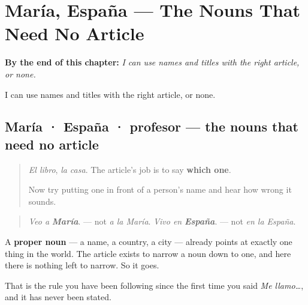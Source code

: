 
\chapter{María, España --- The Nouns That Need No Article}
\label{ch:nombres-propios}

\begin{chapteropening}
\textbf{By the end of this chapter:} \emph{I can use names and titles with the right article, or none.}

I can use names and titles with the right article, or none.
\end{chapteropening}

\section[María · España · profesor]{María · España · profesor — the nouns that need no article}

\label{lesson:ES-C66-nombres-propios}



\begin{quote}
\emph{El libro}, \emph{la casa}. The article's job is to say \textbf{which one}.

Now try putting one in front of a person's name and hear how wrong it sounds.
\end{quote}

\begin{grammarlens}[title={Grammar Lens: nothing left for the article to do}]
\begin{quote}
\emph{Veo a} \emph{\textbf{María}}. — not \emph{a la María}. \emph{Vivo en} \emph{\textbf{España}}. — not \emph{en la España}.
\end{quote}

A \textbf{proper noun} — a name, a country, a city — already points at exactly one thing in the world. The article exists to narrow a noun down to one, and here there is nothing left to narrow. So it goes.

That is the rule you have been following since the first time you said \emph{Me llamo…}, and it has never been stated.
\end{grammarlens}

